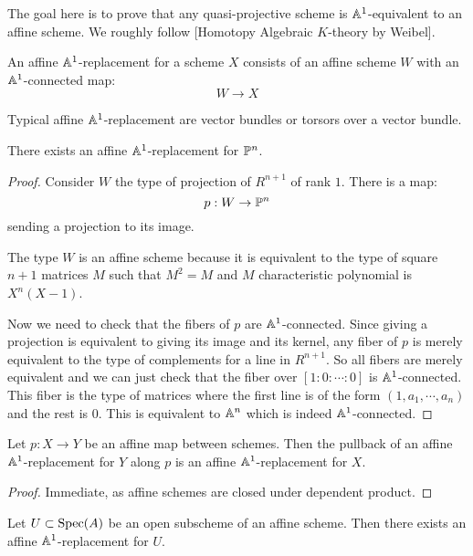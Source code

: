 The goal here is to prove that any quasi-projective scheme is $\mathbb{A}^1$-equivalent to an affine scheme. We roughly follow [Homotopy Algebraic $K$-theory by Weibel].

\begin{definition}
An affine $\mathbb{A}^1$-replacement for a scheme $X$ consists of an affine scheme $W$ with an $\mathbb{A}^1$-connected map:
\[W\to X\]
\end{definition}

Typical affine $\mathbb{A}^1$-replacement are vector bundles or torsors over a vector bundle.

\begin{lemma}\label{projective-A1-replacement}
There exists an affine $\mathbb{A}^1$-replacement for $\mathbb{P}^n$.
\end{lemma}

\begin{proof}
Consider $W$ the type of projection of $R^{n+1}$ of rank $1$. There is a map:
\[p:W\to \mathbb{P}^n\] 
sending a projection to its image.

The type $W$ is an affine scheme because it is equivalent to the type of square $n+1$ matrices $M$ such that $M^2=M$ and $M$ characteristic polynomial is $X^n(X-1)$. 

Now we need to check that the fibers of $p$ are $\mathbb{A}^1$-connected. Since giving a projection is equivalent to giving its image and its kernel, any fiber of $p$ is merely equivalent to the type of complements for a line in $R^{n+1}$. So all fibers are merely equivalent and we can just check that the fiber over $[1:0:\cdots:0]$ is $\mathbb{A}^1$-connected. This fiber is the type of matrices where the first line is of the form $(1,a_1,\cdots,a_n)$ and the rest is $0$. This is equivalent to $\mathbb{A}^n$ which is indeed $\mathbb{A}^1$-connected.
\end{proof}

\begin{lemma}\label{affine-map-A1-replacement}
Let $p:X\to Y$ be an affine map between schemes. Then the pullback of an affine $\mathbb{A}^1$-replacement for $Y$ along $p$ is an affine $\mathbb{A}^1$-replacement for $X$.
\end{lemma}

\begin{proof}
Immediate, as affine schemes are closed under dependent product.
\end{proof}

\begin{lemma}\label{open-A1-replacement}
Let $U\subset\operatorname{Spec}(A)$ be an open subscheme of an affine scheme. Then there exists an affine $\mathbb{A}^1$-replacement for $U$.
\end{lemma}

